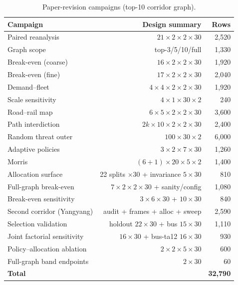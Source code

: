 \documentclass{ieeeaccess}
\begin{document}
\begin{table}[!t]
\caption{Paper-revision campaigns (top-10 corridor graph).}
\label{tab:campaigns}
\centering
\footnotesize
\begin{tabular}{@{}lrr@{}}
\hline
Campaign & Design summary & Rows \\
\hline
Paired reanalysis & $21\times2\times2\times30$ & 2{,}520 \\
Graph scope & top-3/5/10/full & 1{,}330 \\
Break-even (coarse) & $16\times2\times2\times30$ & 1{,}920 \\
Break-even (fine) & $17\times2\times2\times30$ & 2{,}040 \\
Demand--fleet & $4\times4\times2\times2\times30$ & 1{,}920 \\
Scale sensitivity & $4\times1\times30\times2$ & 240 \\
Road--rail map & $6\times5\times2\times2\times30$ & 3{,}600 \\
Path interdiction & $2k\times10\times2\times2\times30$ & 2{,}400 \\
Random threat outer & $100\times30\times2$ & 6{,}000 \\
Adaptive policies & $3\times2\times7\times30$ & 1{,}260 \\
Morris & $(6+1)\times20\times5\times2$ & 1{,}400 \\
Allocation surface & 22 splits $\times 30$ + invariance $5\times30$ & 810 \\
Full-graph break-even & $7\times2\times2\times30$ + sanity/config & 1{,}080 \\
Break-even sensitivity & $3\times6\times30$ + $10\times30$ & 840 \\
Second corridor (Yangyang) & audit + frames + alloc + sweep & 2{,}590 \\
Selection validation & holdout $22\times30$ + bus $15\times30$ & 1{,}110 \\
Joint factorial sensitivity & $16\times30$ + bus-ta12 $16\times30$ & 930 \\
Policy--allocation ablation & $2\times2\times5\times30$ & 600 \\
Full-graph band endpoints & $2\times30$ & 60 \\
\hline
\textbf{Total} & & \textbf{32{,}790} \\
\hline
\end{tabular}
\end{table}
\end{document}
